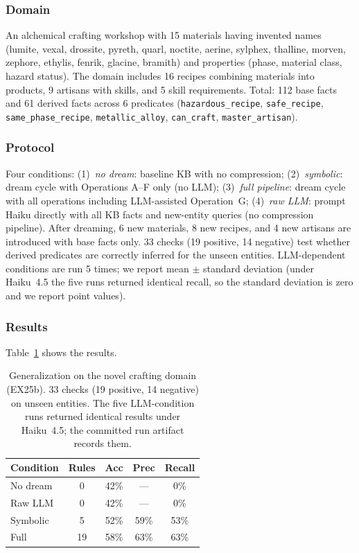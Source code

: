 \documentclass[10pt,conference]{IEEEtran}
\begin{document}
\subsubsection{Domain}
An alchemical crafting workshop with 15 materials having invented names (lumite, vexal, drossite, pyreth, quarl, noctite, aerine, sylphex, thalline, morven, zephore, ethylis, fenrik, glacine, bramith) and properties (phase, material class, hazard status). The domain includes 16 recipes combining materials into products, 9 artisans with skills, and 5 skill requirements. Total: 112 base facts and 61 derived facts across 6 predicates (\texttt{hazardous\_recipe}, \texttt{safe\_recipe}, \texttt{same\_phase\_recipe}, \texttt{metallic\_alloy}, \texttt{can\_craft}, \texttt{master\_artisan}).

\subsubsection{Protocol}
Four conditions: (1)~\textit{no dream}: baseline KB with no compression; (2)~\textit{symbolic}: dream cycle with Operations A--F only (no LLM); (3)~\textit{full pipeline}: dream cycle with all operations including LLM-assisted Operation~G; (4)~\textit{raw LLM}: prompt Haiku directly with all KB facts and new-entity queries (no compression pipeline). After dreaming, 6 new materials, 8 new recipes, and 4 new artisans are introduced with base facts only. 33 checks (19 positive, 14 negative) test whether derived predicates are correctly inferred for the unseen entities. LLM-dependent conditions are run 5 times; we report mean $\pm$ standard deviation (under Haiku~4.5 the five runs returned identical recall, so the standard deviation is zero and we report point values).

\subsubsection{Results}

Table~\ref{tab:novel_generalization} shows the results.

\begin{table}[t]
\centering
\caption{Generalization on the novel crafting domain (EX25b). 33 checks (19 positive, 14 negative) on unseen entities. The five LLM-condition runs returned identical results under Haiku~4.5; the committed run artifact records them.}
\label{tab:novel_generalization}
\begin{tabular}{lcccc}
\toprule
\textbf{Condition} & \textbf{Rules} & \textbf{Acc} & \textbf{Prec} & \textbf{Recall} \\
\midrule
No dream   & 0  & 42\% & ---  & 0\%  \\
Raw LLM    & 0  & 42\% & ---  & 0\%  \\
Symbolic   & 5  & 52\% & 59\% & 53\% \\
Full       & 19 & 58\% & 63\% & 63\% \\
\bottomrule
\end{tabular}
\end{table}
\end{document}
